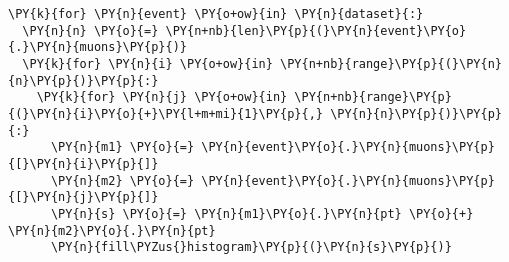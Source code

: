 \begin{Verbatim}[commandchars=\\\{\}]
\PY{k}{for} \PY{n}{event} \PY{o+ow}{in} \PY{n}{dataset}{:}
  \PY{n}{n} \PY{o}{=} \PY{n+nb}{len}\PY{p}{(}\PY{n}{event}\PY{o}{.}\PY{n}{muons}\PY{p}{)}
  \PY{k}{for} \PY{n}{i} \PY{o+ow}{in} \PY{n+nb}{range}\PY{p}{(}\PY{n}{n}\PY{p}{)}\PY{p}{:}
    \PY{k}{for} \PY{n}{j} \PY{o+ow}{in} \PY{n+nb}{range}\PY{p}{(}\PY{n}{i}\PY{o}{+}\PY{l+m+mi}{1}\PY{p}{,} \PY{n}{n}\PY{p}{)}\PY{p}{:}
      \PY{n}{m1} \PY{o}{=} \PY{n}{event}\PY{o}{.}\PY{n}{muons}\PY{p}{[}\PY{n}{i}\PY{p}{]}
      \PY{n}{m2} \PY{o}{=} \PY{n}{event}\PY{o}{.}\PY{n}{muons}\PY{p}{[}\PY{n}{j}\PY{p}{]}
      \PY{n}{s} \PY{o}{=} \PY{n}{m1}\PY{o}{.}\PY{n}{pt} \PY{o}{+} \PY{n}{m2}\PY{o}{.}\PY{n}{pt}
      \PY{n}{fill\PYZus{}histogram}\PY{p}{(}\PY{n}{s}\PY{p}{)}
\end{Verbatim}
